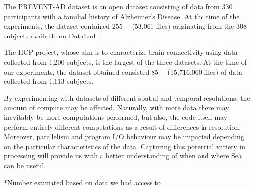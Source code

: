 \documentclass[fleqn,10pt]{wlscirep}
\begin{document}
    
    The PREVENT-AD dataset is an open dataset consisting of data from 330
    participants with a familial history of Alzheimer's Disease. At the time of
    the experiments, the dataset contained \SI{255}{\giga\byte} (53,061 files)
    originating from the 308 subjects available on
    DataLad~\cite{halchenko2021datalad}.
    
    The HCP project, whose aim is to characterize brain connectivity using data
    collected from 1,200 subjects, is the largest of the three datasets. At the
    time of our experiments, the dataset obtained consisted \SI{85}{\tera\byte}
    (15,716,060 files) of data collected from 1,113 subjects.
    
    By experimenting with datasets of different spatial and temporal
    resolutions, the amount of compute may be affected. Naturally, with more
    data there may inevitably be more computations performed, but also, the code
    itself may perform entirely different computations as a result of
    differences in resolution. Moreover, parallelism and program I/O behaviour
    may be impacted depending on the particular characteristics of the data.
    Capturing this potential variety in processing will provide us with a better
    understanding of when and where Sea can be useful.
    
    \begin{table}[t]
      \small\centering
     \footnotesize{*Number estimated based on data we had access
    to}\\
    \caption{Dataset characteristics. Compressed size is listed, since all
    applications, except for SPM, processed compressed
    data}\label{table:sea-neuro:data}
    \end{table}
    
\end{document}

